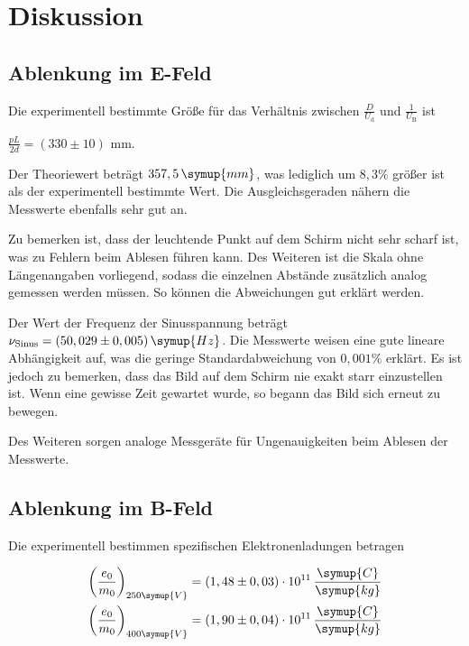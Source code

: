 \section{Diskussion}
\label{sec:Diskussion}

\subsection{Ablenkung im E-Feld}

Die experimentell bestimmte Größe für das Verhältnis zwischen $\frac{D}{U_\text{d}}$ und $\frac{1}{U_\text{B}}$ ist 

\begin{center}
    $\frac{p L }{2 d} = (330 \pm 10)$ mm.
\end{center}

Der Theoriewert beträgt $357,5 \, \symup{mm}$, was lediglich um $8,3 \%$ größer ist als der experimentell bestimmte Wert.
Die Ausgleichsgeraden nähern die Messwerte ebenfalls sehr gut an.

Zu bemerken ist, dass der leuchtende Punkt auf dem Schirm nicht sehr scharf ist, was zu Fehlern beim Ablesen führen kann.
Des Weiteren ist die Skala ohne Längenangaben vorliegend, sodass die einzelnen Abstände zusätzlich analog gemessen werden müssen.
So können die Abweichungen gut erklärt werden.

Der Wert der Frequenz der Sinusspannung beträgt $\nu_\text{Sinus} = (50,029 \pm 0,005) \, \symup{Hz}$.
Die Messwerte weisen eine gute lineare Abhängigkeit auf, was die geringe Standardabweichung von $0,001 \%$ erklärt.
Es ist jedoch zu bemerken, dass das Bild auf dem Schirm nie exakt starr einzustellen ist. Wenn eine gewisse Zeit gewartet wurde,
so begann das Bild sich erneut zu bewegen.

Des Weiteren sorgen analoge Messgeräte für Ungenauigkeiten beim Ablesen der Messwerte.

\subsection{Ablenkung im B-Feld}

Die experimentell bestimmen spezifischen Elektronenladungen betragen

\begin{align*}
  \bigg( \frac{e_0}{m_0} \bigg)_{250 \symup{V}} &= (1,48 \pm 0,03) \cdot 10^{11} \, \frac{\symup{C}}{\symup{kg}} \\
  \bigg( \frac{e_0}{m_0} \bigg)_{400 \symup{V}} &= (1,90 \pm 0,04) \cdot 10^{11} \, \frac{\symup{C}}{\symup{kg}}
\end{align*}

